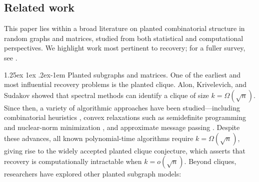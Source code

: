 \documentclass[12pt]{article}
\makeatletter
\renewcommand{\paragraph}{%
  \@startsection{paragraph}{4}%
  {\z@}{1.25ex \@plus 1ex \@minus .2ex}{-1em}%
  {\normalfont\normalsize\bfseries}%
}
\makeatother
\begin{document}
\subsection{Related work}

This paper lies within a broad literature on planted combinatorial structure in random graphs and matrices, studied from both statistical and computational perspectives. We highlight work most pertinent to recovery; for a fuller survey, see \cite{elimelech2025detecting}.

\paragraph{Planted subgraphs and matrices.} One of the earliest and most influential recovery problems is the planted clique. Alon, Krivelevich, and Sudakov \cite{alon1998finding} showed that spectral methods can identify a clique of size $k = \Omega(\sqrt{n})$. Since then, a variety of algorithmic approaches have been studied—including combinatorial heuristics \cite{feige2000finding, mcsherry2001spectral, feige2010finding}, convex relaxations such as semidefinite programming and nuclear-norm minimization \cite{ames2011nuclear, deshpande2015finding}, and approximate message passing \cite{chen2016statistical}. Despite these advances, all known polynomial-time algorithms require $k = \Omega(\sqrt{n})$, giving rise to the widely accepted planted clique conjecture, which asserts that recovery is computationally intractable when $k = o(\sqrt{n})$. Beyond cliques, researchers have explored other planted subgraph models:
\end{document}
